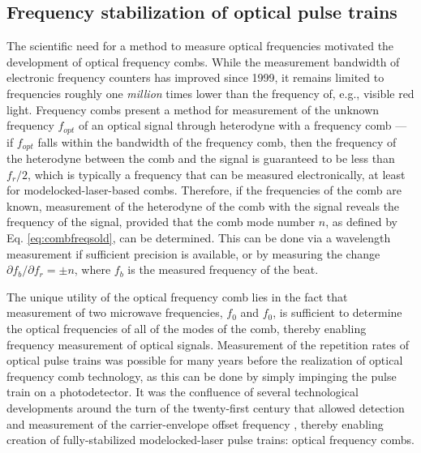 \subsection{Frequency stabilization of optical pulse trains}

The scientific need for a method to measure optical frequencies motivated the development of optical frequency combs. While the measurement bandwidth of electronic frequency counters has improved since 1999, it remains limited to frequencies roughly one \textit{million} times lower than the frequency of, e.g., visible red light. Frequency combs present a method for measurement of the unknown frequency $f_{opt}$ of an optical signal through heterodyne with a frequency comb --- if $f_{opt}$ falls within the bandwidth of the frequency comb, then the frequency of the heterodyne between the comb and the signal is guaranteed to be less than $f_r/2$, which is typically a frequency that can be measured electronically, at least for modelocked-laser-based combs. Therefore, if the frequencies of the comb are known, measurement of the heterodyne of the comb with the signal reveals the frequency of the signal, provided that the comb mode number $n$, as defined by Eq. \ref{eq:combfreqsold}, can be determined. This can be done via a wavelength measurement if sufficient precision is available, or by measuring the change $\partial f_b/\partial f_r=\pm n$, where $f_b$ is the measured frequency of the beat.

The unique utility of the optical frequency comb lies in the fact that measurement of two microwave frequencies, $f_0$ and $f_0$, is sufficient to determine the optical frequencies of all of the modes of the comb, thereby enabling frequency measurement of optical signals. Measurement of the repetition rates of optical pulse trains was possible for many years before the realization of optical frequency comb technology, as this can be done by simply impinging the pulse train on a photodetector. It was the confluence of several technological developments around the turn of the twenty-first century that allowed detection and measurement of the carrier-envelope offset frequency , thereby enabling creation of fully-stabilized modelocked-laser pulse trains: optical frequency combs.

